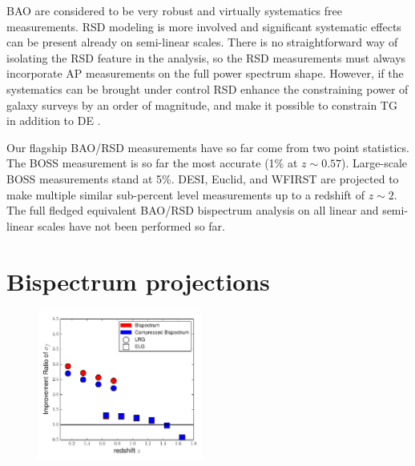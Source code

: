 BAO are considered to be very robust and virtually systematics free
measurements. RSD modeling is more involved and significant systematic effects
can be present already on semi-linear scales. There is no straightforward way
of isolating the RSD feature in the analysis, so the RSD measurements must
always incorporate AP measurements on the full power spectrum shape. However,
if the systematics can be brought under control RSD enhance the constraining
power of galaxy surveys by an order of magnitude, and make it possible to
constrain TG in addition to DE \cite{2011MNRAS.410.1993S}.

Our flagship BAO/RSD measurements have so far come from two point statistics.
The BOSS measurement is so far the most accurate (1\% at $z\sim0.57$).
Large-scale BOSS measurements stand at 5\%.  DESI, Euclid, and WFIRST are
projected to make multiple similar sub-percent level measurements up to a
redshift of $z\sim 2$. The full fledged equivalent BAO/RSD bispectrum
analysis on all linear and semi-linear scales have not been performed so
far. 

\section{Bispectrum projections}

\begin{figure}
\begin{center}
\includegraphics[width=0.48\textwidth]{fz.pdf}
\end{center}
\end{figure}


